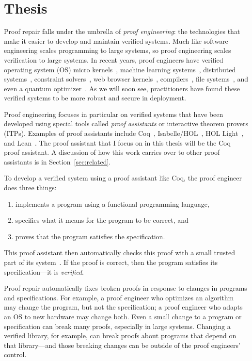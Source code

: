 \section{Thesis}

Proof repair falls under the umbrella of \textit{proof engineering}: the technologies that make it easier
to develop and maintain verified systems.
Much like software engineering scales programming to large systems, so proof engineering scales verification to large systems. 
In recent years, proof engineers have verified operating system (OS) micro kernels~\cite{Klein2009, Klein2014micro}, machine learning systems~\cite{TODO}, distributed systems~\cite{TODO}, constraint solvers~\cite{TODO}, web browser kernels~\cite{TODO}, compilers~\cite{Leroy:POPL06, Leroy2009}, file systems~\cite{TODO}, and even a quantum optimizer~\cite{TODO}.
As we will soon see, practitioners have found these verified systems to be more robust and secure in deployment. %

Proof engineering focuses in particular on verified systems that have been
developed using special tools called \textit{proof assistants} or interactive theorem provers (ITPs).
Examples of proof assistants include Coq~\cite{coq}, Isabelle/HOL~\cite{isabelle}, 
HOL Light~\cite{hollight}, and Lean~\cite{lean}.
The proof assistant that I focus on in this thesis will be the Coq proof assistant.
A discussion of how this work carries over to other proof assistants is in Section~\ref{sec:related}.

To develop a verified system using a proof assistant like Coq, the proof engineer does three things:

\begin{enumerate}
\item implements a program using a functional programming language,
\item specifies what it means for the program to be correct, and
\item proves that the program satisfies the specification.
\end{enumerate}
This proof assistant then automatically checks this proof with a small trusted part of its system~\cite{Barendregt2002,Barendregt2351}.
If the proof is correct, then the program satisfies its specification---it is \textit{verified}.

Proof repair automatically fixes broken proofs in response to changes in programs and specifications.
For example, a proof engineer who optimizes an algorithm may change the program, but not the specification; a proof engineer who adapts an OS to new hardware may change both. Even a small change to a program or specification can break many proofs, especially in large systems.
Changing a verified library, for example, can break proofs about programs that depend on that library---and those breaking changes
can be outside of the proof engineers' control.

